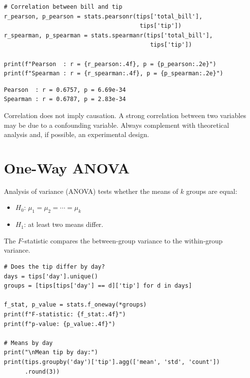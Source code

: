 \begin{codeblock}[title=\textbf{Python}]
\begin{verbatim}
# Correlation between bill and tip
r_pearson, p_pearson = stats.pearsonr(tips['total_bill'],
                                       tips['tip'])
r_spearman, p_spearman = stats.spearmanr(tips['total_bill'],
                                          tips['tip'])

print(f"Pearson  : r = {r_pearson:.4f}, p = {p_pearson:.2e}")
print(f"Spearman : r = {r_spearman:.4f}, p = {p_spearman:.2e}")
\end{verbatim}
\end{codeblock}

\begin{codeoutput}
\begin{verbatim}
Pearson  : r = 0.6757, p = 6.69e-34
Spearman : r = 0.6787, p = 2.83e-34
\end{verbatim}
\end{codeoutput}

\begin{warning}
Correlation does not imply causation. A strong correlation between two variables may be due to a confounding variable. Always complement with theoretical analysis and, if possible, an experimental design.
\end{warning}

\section{One-Way ANOVA}

\begin{definition}[ANOVA]
Analysis of variance (ANOVA) tests whether the means of $k$ groups are equal:
\begin{itemize}
    \item $H_0$: $\mu_1 = \mu_2 = \cdots = \mu_k$
    \item $H_1$: at least two means differ.
\end{itemize}
The $F$-statistic compares the between-group variance to the within-group variance.
\end{definition}

\begin{codeblock}[title=\textbf{Python}]
\begin{verbatim}
# Does the tip differ by day?
days = tips['day'].unique()
groups = [tips[tips['day'] == d]['tip'] for d in days]

f_stat, p_value = stats.f_oneway(*groups)
print(f"F-statistic: {f_stat:.4f}")
print(f"p-value: {p_value:.4f}")

# Means by day
print("\nMean tip by day:")
print(tips.groupby('day')['tip'].agg(['mean', 'std', 'count'])
      .round(3))
\end{verbatim}
\end{codeblock}

